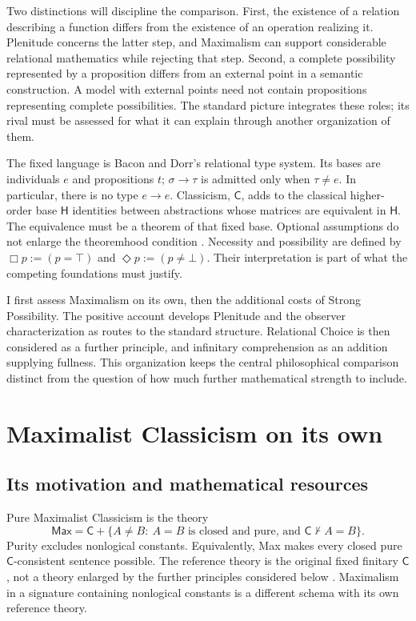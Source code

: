 \documentclass[12pt,letterpaper]{article}
\newcommand{\Hlogic}{\mathsf H}
\newcommand{\C}{\mathsf C}
\newcommand{\Max}{\mathsf{Max}}
\begin{document}
Two distinctions will discipline the comparison. First, the existence of a relation describing a function differs from the existence of an operation realizing it. Plenitude concerns the latter step, and Maximalism can support considerable relational mathematics while rejecting that step. Second, a complete possibility represented by a proposition differs from an external point in a semantic construction. A model with external points need not contain propositions representing complete possibilities. The standard picture integrates these roles; its rival must be assessed for what it can explain through another organization of them.

The fixed language is Bacon and Dorr's relational type system. Its bases are individuals $e$ and propositions $t$; $\sigma\to\tau$ is admitted only when $\tau\ne e$. In particular, there is no type $e\to e$. Classicism, $\C$, adds to the classical higher-order base $\Hlogic$ identities between abstractions whose matrices are equivalent in $\Hlogic$. The equivalence must be a theorem of that fixed base. Optional assumptions do not enlarge the theoremhood condition \citep[\S\S1.1, 1.3]{bacondorr}. Necessity and possibility are defined by $\Box p:=(p=\top)$ and $\Diamond p:=(p\ne\bot)$. Their interpretation is part of what the competing foundations must justify.

I first assess Maximalism on its own, then the additional costs of Strong Possibility. The positive account develops Plenitude and the observer characterization as routes to the standard structure. Relational Choice is then considered as a further principle, and infinitary comprehension as an addition supplying fullness. This organization keeps the central philosophical comparison distinct from the question of how much further mathematical strength to include.

\section{Maximalist Classicism on its own}\label{sec:max}

\subsection{Its motivation and mathematical resources}

Pure Maximalist Classicism is the theory
\[
 \Max=\C+\{A\ne B:\ A=B\text{ is closed and pure, and }
                       \C\nvdash A=B\}.
\]
Purity excludes nonlogical constants. Equivalently, Max makes every closed pure $\C$-consistent sentence possible. The reference theory is the original fixed finitary $\C$, not a theory enlarged by the further principles considered below \citep[\S2.4]{bacondorr}. Maximalism in a signature containing nonlogical constants is a different schema with its own reference theory.
\end{document}
